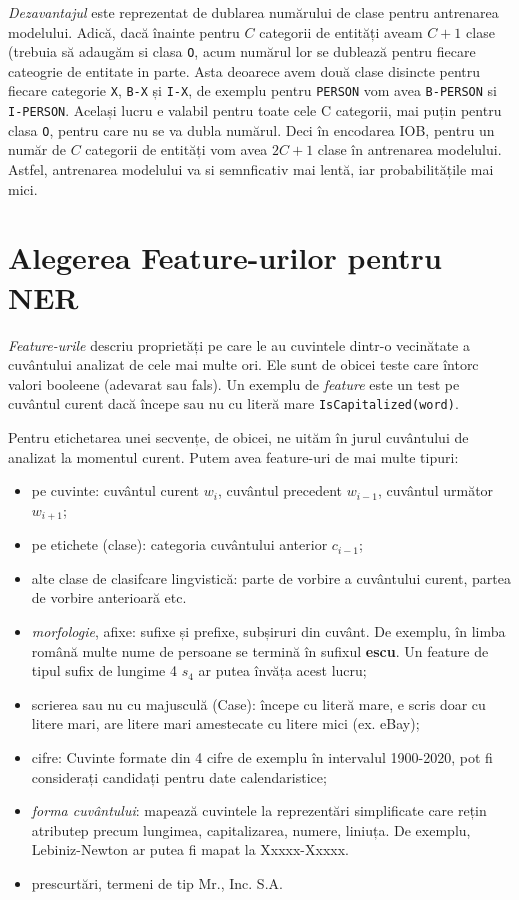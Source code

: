 \textit{Dezavantajul} este reprezentat de dublarea numărului de clase pentru antrenarea modelului. Adică, dacă înainte pentru $C$ categorii de entități aveam $C + 1 $ clase (trebuia să adaugăm si clasa \texttt{O}, acum numărul lor se dublează pentru fiecare cateogrie de entitate in parte. Asta deoarece avem două clase disincte pentru fiecare categorie \texttt{X}, \texttt{B-X} și \texttt{I-X}, de exemplu pentru \texttt{PERSON} vom avea \texttt{B-PERSON} si \texttt{I-PERSON}. Același lucru e valabil pentru toate cele C categorii, mai puțin pentru clasa \texttt{O}, pentru care nu se va dubla numărul. Deci în encodarea IOB, pentru un număr de $C$ categorii de entități vom avea $2C + 1 $ clase în antrenarea modelului. Astfel, antrenarea modelului va si semnficativ mai lentă, iar probabilitățile mai mici.

\section{Alegerea Feature-urilor pentru NER}

\textit{Feature-urile} descriu proprietăți pe care le au cuvintele dintr-o vecinătate a cuvântului analizat de cele mai multe ori. Ele sunt de obicei teste care întorc valori booleene (adevarat sau fals). Un exemplu de \textit{feature} este un test pe cuvântul curent dacă începe sau nu cu literă mare \texttt{IsCapitalized(word)}.

Pentru etichetarea unei secvențe, de obicei, ne uităm în jurul cuvântului de analizat la momentul curent. Putem avea feature-uri de mai multe tipuri:

\begin{itemize}
\item pe cuvinte: cuvântul curent $w_i$, cuvântul precedent $w_{i-1}$, cuvântul următor $w_{i+1}$;
\item pe etichete (clase): categoria cuvântului anterior $c_{i-1}$;
\item alte clase de clasifcare lingvistică: parte de vorbire a cuvântului curent, partea de vorbire anterioară etc.
\item \textit{morfologie}, afixe: sufixe și prefixe, subșiruri din cuvânt. De exemplu, în limba română multe nume de persoane se termină în sufixul \textbf{escu}. Un feature de tipul sufix de lungime 4 $s_4$ ar putea învăța acest lucru;
\item scrierea sau nu cu majusculă (Case): începe cu literă mare, e scris doar cu litere mari, are litere mari amestecate cu litere mici (ex. eBay);
\item cifre: Cuvinte formate din 4 cifre de exemplu  în intervalul 1900-2020, pot fi considerați candidați pentru date calendaristice;
\item \textit{forma cuvântului}: mapează cuvintele la reprezentări simplificate care rețin atributep precum lungimea, capitalizarea, numere, liniuța. De exemplu, Lebiniz-Newton ar putea fi mapat la Xxxxx-Xxxxx.
\item prescurtări, termeni de tip Mr., Inc. S.A.

\end{itemize}

